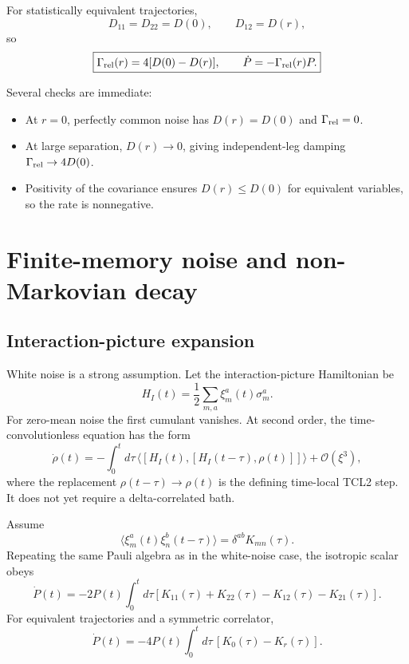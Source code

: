 \documentclass[11pt]{article}
\begin{document}
For statistically equivalent trajectories,
\begin{equation}
D_{11}=D_{22}=D(0),
\qquad
D_{12}=D(r),
\end{equation}
so
\begin{equation}
\boxed{
\Gamma_{\rm rel}(r)=4[D(0)-D(r)],
\qquad
\dot P=-\Gamma_{\rm rel}(r)P.
}
\label{eq:Gammarel}
\end{equation}

Several checks are immediate:

\begin{itemize}[leftmargin=1.5em]
\item At $r=0$, perfectly common noise has $D(r)=D(0)$ and $\Gamma_{\rm rel}=0$.
\item At large separation, $D(r)\to0$, giving independent-leg damping $\Gamma_{\rm rel}\to4D(0)$.
\item Positivity of the covariance ensures $D(r)\le D(0)$ for equivalent variables, so the rate is nonnegative.
\end{itemize}

\section{Finite-memory noise and non-Markovian decay}

\subsection{Interaction-picture expansion}

White noise is a strong assumption. Let the interaction-picture Hamiltonian be
\begin{equation}
H_I(t)=\frac12\sum_{m,a}\xi_m^a(t)\sigma_m^a.
\end{equation}
For zero-mean noise the first cumulant vanishes. At second order, the time-convolutionless equation has the form
\begin{equation}
\dot\rho(t)
=-\int_0^t d\tau\,
\langle[H_I(t),[H_I(t-\tau),\rho(t)]]\rangle
+\mathcal O(\xi^3),
\label{eq:TCL2}
\end{equation}
where the replacement $\rho(t-\tau)\to\rho(t)$ is the defining time-local TCL2 step. It does not yet require a delta-correlated bath.

Assume
\begin{equation}
\langle\xi_m^a(t)\xi_n^b(t-\tau)\rangle
=\delta^{ab}K_{mn}(\tau).
\label{eq:memorycorr}
\end{equation}
Repeating the same Pauli algebra as in the white-noise case, the isotropic scalar obeys
\begin{equation}
\boxed{
\dot P(t)
=-2P(t)\int_0^t d\tau
\left[K_{11}(\tau)+K_{22}(\tau)-K_{12}(\tau)-K_{21}(\tau)\right].
}
\label{eq:TCLP}
\end{equation}
For equivalent trajectories and a symmetric correlator,
\begin{equation}
\boxed{
\dot P(t)
=-4P(t)\int_0^t d\tau\,[K_0(\tau)-K_r(\tau)].
}
\label{eq:TCLPsym}
\end{equation}
\end{document}
